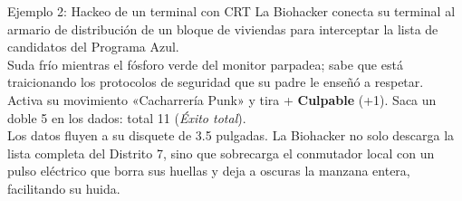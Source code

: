 \begin{CajaEjemplo}{Ejemplo 2: Hackeo de un terminal con CRT}
 La Biohacker conecta su terminal al armario de distribución de un bloque de viviendas para interceptar la lista de candidatos del Programa Azul.\\
 Suda frío mientras el fósforo verde del monitor parpadea; sabe que está traicionando los protocolos de seguridad que su padre le enseñó a respetar.\\
 Activa su movimiento «Cacharrería Punk» y tira + \textbf{Culpable} (+1). Saca un doble 5 en los dados: total 11 (\emph{Éxito total}).\\
 Los datos fluyen a su disquete de 3.5 pulgadas. La Biohacker no solo descarga la lista completa del Distrito 7, sino que sobrecarga el conmutador local con un pulso eléctrico que borra sus huellas y deja a oscuras la manzana entera, facilitando su huida.
\end{CajaEjemplo}
